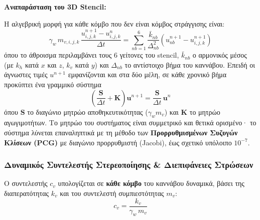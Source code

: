 \documentclass[11pt,a4paper]{article}
\begin{document}
\textbf{Αναπαράσταση του 3D Stencil:}
\begin{center}
\end{center}

Η αλγεβρική μορφή για κάθε κόμβο που δεν είναι κόμβος στράγγισης είναι:
\begin{equation}\label{eq:be}
  \gamma_w\, m_{v,i,j,k}\,\frac{u^{n+1}_{i,j,k} - u^{n}_{i,j,k}}{\Delta t} = \sum_{nb=1}^{6} \frac{\bar{k}_{nb}}{\Delta_{nb}^2}\left(u^{n+1}_{nb} - u^{n+1}_{i,j,k}\right)
\end{equation}
όπου το άθροισμα περιλαμβάνει τους 6 γείτονες του stencil, $\bar{k}_{nb}$ ο αρμονικός μέσος (με $k_h$ κατά $x$ και $z$, $k_v$ κατά $y$) και $\Delta_{nb}$ το αντίστοιχο βήμα του καννάβου. Επειδή οι άγνωστες τιμές $u^{n+1}$ εμφανίζονται και στα δύο μέλη, σε κάθε χρονικό βήμα προκύπτει ένα γραμμικό σύστημα
\begin{equation}
  \left(\frac{\mathbf{S}}{\Delta t} + \mathbf{K}\right)\mathbf{u}^{n+1} = \frac{\mathbf{S}}{\Delta t}\,\mathbf{u}^{n}
\end{equation}
όπου $\mathbf{S}$ το διαγώνιο μητρώο αποθηκευτικότητας ($\gamma_w m_v$) και $\mathbf{K}$ το μητρώο αγωγιμοτήτων. Το μητρώο του συστήματος είναι συμμετρικό και θετικά ορισμένο· το σύστημα λύνεται επαναληπτικά με τη μέθοδο των \textbf{Προρρυθμισμένων Συζυγών Κλίσεων (PCG)} με διαγώνιο προρρυθμιστή (Jacobi), έως σχετικό υπόλοιπο $10^{-7}$.

\subsubsection{Δυναμικός Συντελεστής Στερεοποίησης \& Διεπιφάνειες Στρώσεων}\label{sec:cv}

Ο συντελεστής $c_v$ υπολογίζεται σε \textbf{κάθε κόμβο} του καννάβου δυναμικά, βάσει της διαπερατότητας $k_v$ και του συντελεστή συμπιεστότητας $m_v$:
\begin{equation}
  c_v = \frac{k_v}{\gamma_w\, m_v}
\end{equation}
\end{document}
